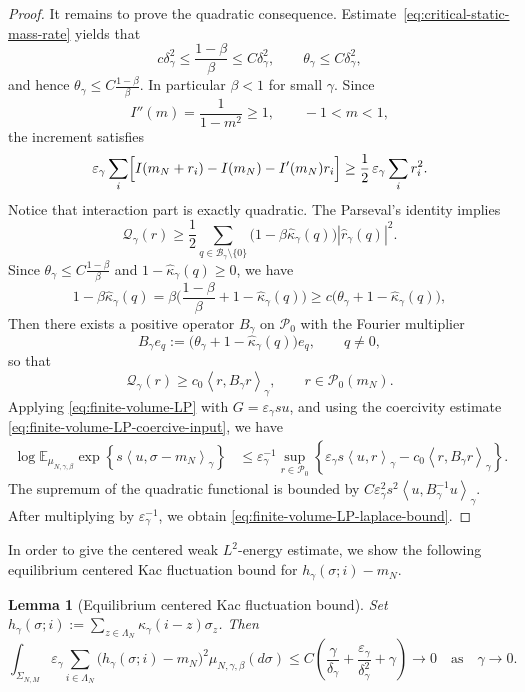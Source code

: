 \documentclass{article}
\newtheorem{lemma}{Lemma}
\begin{document}
\begin{proof}
It remains to prove the quadratic consequence.  
Estimate~\ref{eq:critical-static-mass-rate} yields that
\[
c\delta_\gamma^2\le \frac{1-\beta}{\beta} \le C\delta_\gamma^2,
\qquad
\theta_\gamma\le C\delta_\gamma^2,
\]
and hence \(\theta_\gamma\le C \frac{1-\beta}{\beta}\).  In particular
\(\beta<1\) for small \(\gamma\).
Since
\[
I''(m)=\frac1{1-m^2}\ge1,\qquad -1<m<1,
\]
the increment satisfies
\[
\varepsilon_\gamma\sum_i
\Bigl[
I(m_N+r_i)-I(m_N)-I'(m_N)r_i
\Bigr]
\ge
\frac12\,\varepsilon_\gamma\sum_i r_i^2 .
\]
Notice that interaction part is exactly quadratic. The Parseval's identity implies
\[
\mathcal Q_\gamma(r)
\ge
\frac12
\sum_{q\in\mathcal B_\gamma\setminus\{0\}}
\bigl(1-\beta\widehat\kappa_\gamma(q)\bigr)
|\widehat r_\gamma(q)|^2 .
\]
Since \(\theta_\gamma\le C  \frac{1-\beta}{\beta}  \) and
\(1-\widehat\kappa_\gamma(q)\ge0\), we have
\[
1-\beta\widehat\kappa_\gamma(q)
=
\beta\bigl( \frac{1-\beta}{\beta} +1-\widehat\kappa_\gamma(q)\bigr)
\ge
c\bigl(\theta_\gamma+1-\widehat\kappa_\gamma(q)\bigr),
\]
Then there exists a positive operator \(B_\gamma\) on \(\mathcal P_0\) with the Fourier multiplier
\[
B_\gamma e_q
:=
\bigl(\theta_\gamma+1-\widehat\kappa_\gamma(q)\bigr)e_q,
\qquad q\ne0,
\]
so that
\begin{equation}\label{eq:finite-volume-LP-coercive-input}
\mathcal Q_\gamma(r)
\ge c_0\left\langle r,B_\gamma r\right\rangle_\gamma,
\qquad r\in\mathcal P_0(m_N).
\end{equation}
Applying \eqref{eq:finite-volume-LP} with \(G=\varepsilon_\gamma s u\),
and using the coercivity estimate \eqref{eq:finite-volume-LP-coercive-input}, we have 
\[
\begin{aligned}
\log
\mathbb E_{\mu_{N,\gamma,\beta}}
\exp\left\{
s\left\langle u,\sigma-m_N\right\rangle_\gamma
\right\}
&\le
\varepsilon_\gamma^{-1}
\sup_{r\in\mathcal P_0}
\left\{
\varepsilon_\gamma s\left\langle u,r\right\rangle_\gamma - c_0\left\langle r,B_\gamma r\right\rangle_\gamma
\right\}.
\end{aligned}
\]
The supremum of the quadratic functional is bounded by $C\varepsilon_\gamma^2s^2 \left\langle u, B_\gamma^{-1}u\right\rangle_\gamma$.
After multiplying by \(\varepsilon_\gamma^{-1}\), we obtain \eqref{eq:finite-volume-LP-laplace-bound}.
\end{proof}

In order to give the centered weak $L^2$-energy estimate, we show the following equilibrium centered Kac fluctuation bound for $h_\gamma(\sigma;i)-m_N$.


\begin{lemma}[Equilibrium centered Kac fluctuation bound]
\label{lem:equilibrium-centered-kac-fluctuation}
Set $h_\gamma(\sigma;i) := \sum_{z\in\Lambda_N}\kappa_\gamma(i-z)\sigma_z$.
Then
\begin{equation}\label{eq:equilibrium-centered-h-fluctuation-rate}
    \int_{\Sigma_{N,M}}
\varepsilon_\gamma\sum_{i\in\Lambda_N}\bigl(h_\gamma(\sigma;i)-m_N\bigr)^2
\mu_{N,\gamma,\beta}(d\sigma)
\le C\left(
\frac{\gamma}{\delta_\gamma}+
\frac{\varepsilon_\gamma}{\delta_\gamma^2}+
\gamma\right) \to 0 \quad \text{as} \quad \gamma \to 0.
\end{equation}
\end{lemma}
\end{document}
